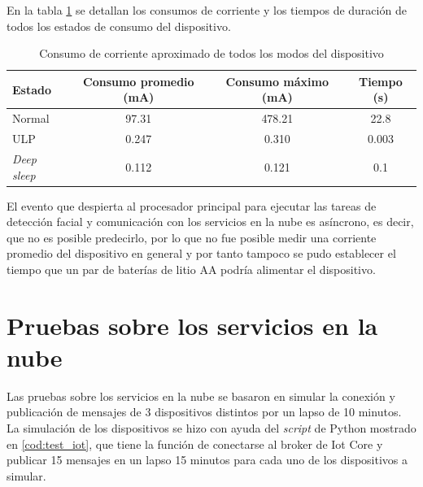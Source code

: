 En la tabla \ref{tab:test_ulp} se detallan los consumos de corriente y los tiempos de duración de todos los estados de consumo del dispositivo.

\begin{table}[h]
	\centering
	\caption[Consumo de corriente del dispositivo]{Consumo de corriente aproximado de todos los modos del dispositivo}
	\begin{tabular}{lccc}   
		\toprule
		\textbf{Estado} & \textbf{Consumo promedio (mA)} & \textbf{Consumo máximo (mA)} & \textbf{Tiempo (s)} \\
		\midrule
		Normal & 97.31 & 478.21 & 22.8 \\
		ULP & 0.247 & 0.310 & 0.003 \\
		\textit{Deep sleep} & 0.112 & 0.121 & 0.1 \\
		\bottomrule
		\hline
	\end{tabular}
	\label{tab:test_ulp}
\end{table}

El evento que despierta al procesador principal para ejecutar las tareas de detección facial y comunicación con los servicios en la nube es asíncrono, es decir, que no es posible predecirlo, por lo que no fue posible medir una corriente promedio del dispositivo en general y por tanto tampoco se pudo establecer el tiempo que un par de baterías de litio AA podría alimentar el dispositivo.

\section{Pruebas sobre los servicios en la nube}
Las pruebas sobre los servicios en la nube se basaron en simular la conexión y publicación de mensajes de 3 dispositivos distintos por un lapso de 10 minutos. La simulación de los dispositivos se hizo con ayuda del \textit{script} de Python mostrado en \ref{cod:test_iot}, que tiene la función de conectarse al broker de Iot Core y publicar 15 mensajes en un lapso 15 minutos para cada uno de los dispositivos a simular.


